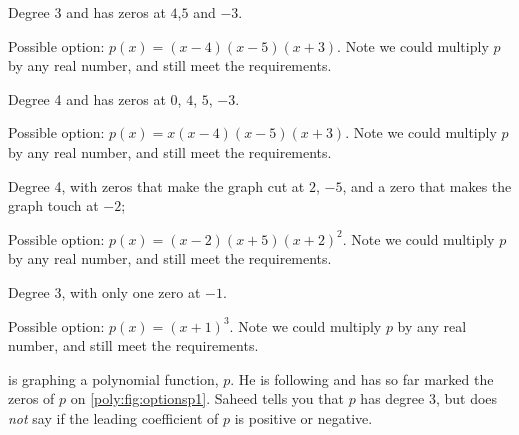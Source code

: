 \begin{exercises}
\begin{problem}
\begin{subproblem}
	 \end{subproblem}
	 \begin{subproblem}
		 Degree 3 and has zeros at $4$,$5$ and $-3$.
		 \begin{shortsolution}
			 Possible option: $p(x)=(x-4)(x-5)(x+3)$. Note we could multiply $p$ by any real number, and still meet the requirements.
		 \end{shortsolution}
	 \end{subproblem}
	 \begin{subproblem}
		 Degree 4 and has zeros at $0$, $4$, $5$, $-3$.
		 \begin{shortsolution}
			 Possible option: $p(x)=x(x-4)(x-5)(x+3)$. Note we could multiply $p$ by any real number, and still meet the requirements.
		 \end{shortsolution}
	 \end{subproblem}
	 \begin{subproblem}
		 Degree 4, with zeros that make the graph cut at $2$, $-5$, and a zero that makes the graph touch at $-2$;
		 \begin{shortsolution}
			 Possible option: $p(x)=(x-2)(x+5)(x+2)^2$. Note we could multiply $p$ by any real number, and still meet the requirements.
		 \end{shortsolution}
	 \end{subproblem}
	 \begin{subproblem}
		 Degree 3, with only one zero at $-1$.
		 \begin{shortsolution}
			 Possible option: $p(x)=(x+1)^3$. Note we could multiply $p$ by any real number, and still meet the requirements.
		 \end{shortsolution}
	 \end{subproblem}
	 \end{problem}
	 \begin{problem}
	  is graphing a polynomial function, $p$.
	 He is following  and has so far
	 marked the zeros of $p$ on \cref{poly:fig:optionsp1}. Saheed tells you that
	 $p$ has degree $3$, but does \emph{not} say if the leading coefficient
	 of $p$ is positive or negative.
	 \begin{figure}[!htbp]
		 \begin{widepage}
		 \begin{subfigure}{.45\textwidth}
			 \begin{tikzpicture}

\end{tikzpicture}
\end{subfigure}
\end{widepage}
\end{figure}
\end{problem}
\end{exercises}
